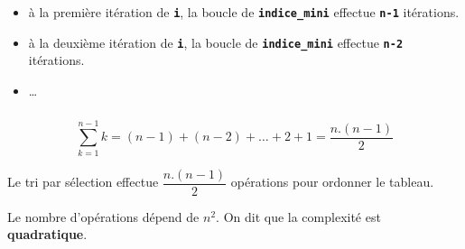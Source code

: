 \documentclass[svgnames,11pt]{beamer}
\begin{document}
\begin{frame}[fragile]
    \begin{itemize}
        \item à la première itération de \textbf{\texttt{i}}, la boucle de \textbf{\texttt{indice\_mini}} effectue \textbf{\texttt{n-1}} itérations.
        \begin{center}
            \end{center}
        \item à la deuxième itération de \textbf{\texttt{i}}, la boucle de \textbf{\texttt{indice\_mini}} effectue \textbf{\texttt{n-2}} itérations.
        \begin{center}
            \end{center}
        \item \dots
    \end{itemize}
    
\end{frame}
\begin{frame}
    \frametitle{}
    $$\sum_{k=1}^{n-1}{k}=(n-1)+(n-2)+\dots+2+1=\dfrac{n.(n-1)}{2}$$
    \begin{aretenir}[]
        Le tri par sélection effectue $\dfrac{n.(n-1)}{2}$ opérations pour ordonner le tableau. 
        
        \centering Le nombre d'opérations dépend de $n^2$. On dit que la complexité est \textbf{quadratique}.
    \end{aretenir}

\end{frame}
\end{document}
